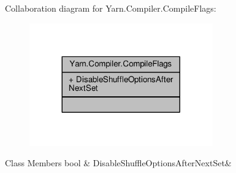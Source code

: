 Collaboration diagram for Yarn.\-Compiler.\-Compile\-Flags\-:
\nopagebreak
\begin{figure}[H]
\begin{center}
\leavevmode
\includegraphics[width=224pt]{a00363}
\end{center}
\end{figure}
\begin{DoxyFields}{Class Members}
\hypertarget{a00053_a8b49bb7763ff477cba21d7c771ef3ed0}{bool}\label{a00053_a8b49bb7763ff477cba21d7c771ef3ed0}
&
Disable\-Shuffle\-Options\-After\-Next\-Set&
\\
\hline

\end{DoxyFields}
